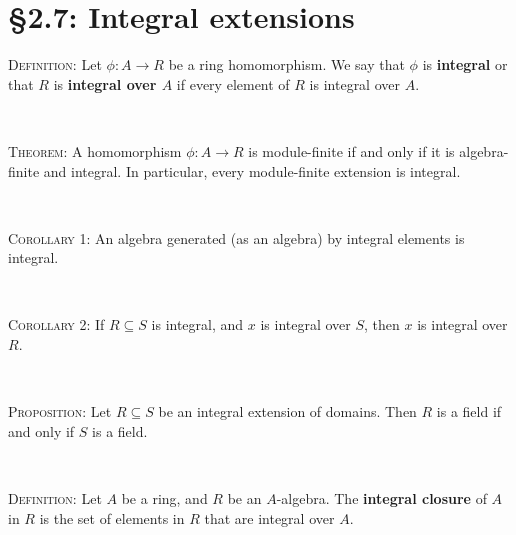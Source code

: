 \documentclass[12pt]{amsart}
\newcommand{\1}{\mathbbm{1}}
\newcommand{\showsol}[1]{\def\displaysol{#1}}
\begin{document}
\showsol{0}
	
	\thispagestyle{empty}
	
	\section*{\S2.7: Integral extensions}	

\begin{framed}

\noindent \textsc{Definition:} Let $\phi: A\to R$ be a ring homomorphism. We say that $\phi$ is \textbf{integral} or that $R$ is \textbf{integral over $A$} if every element of $R$ is integral over $A$.

\

\noindent \textsc{Theorem:} A homomorphism $\phi: A \to R$ is module-finite if and only if it is algebra-finite and integral. In particular, every module-finite extension is integral.

\

\noindent \textsc{Corollary 1:} An algebra generated (as an algebra) by integral elements is integral. 

\

\noindent \textsc{Corollary 2:} If $R\subseteq S$ is integral, and $x$ is integral over $S$, then $x$ is integral over $R$.

\



\noindent \textsc{Proposition:} Let $R\subseteq S$ be an integral extension of domains. Then $R$ is a field if and only if $S$ is a field.

\

\noindent \textsc{Definition:} Let $A$ be a ring, and $R$ be an $A$-algebra. The \textbf{integral closure} of $A$ in $R$ is the set of elements in $R$ that are integral over $A$. 
 \end{framed}
 
\end{document}
